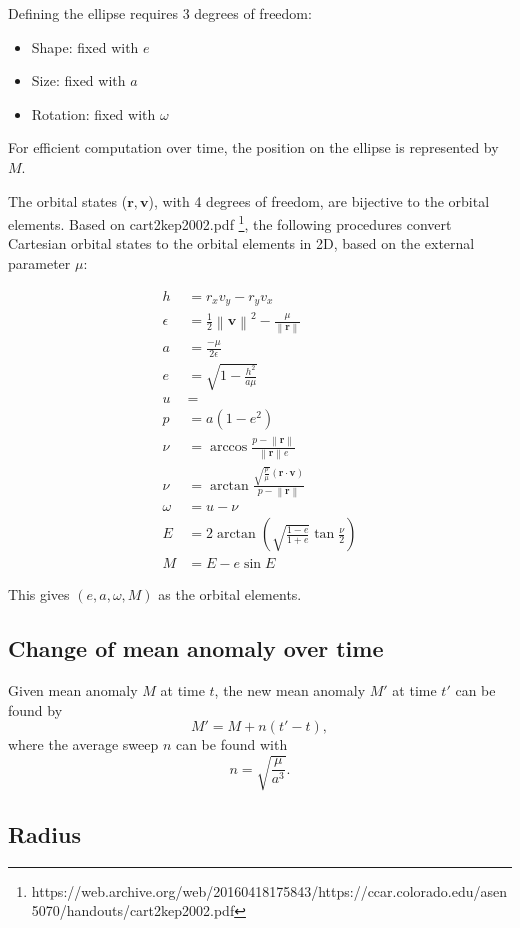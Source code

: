 \documentclass{article}
\def\p#1{ \left( #1 \right)}
\def\norm#1{ \left\lVert #1 \right\rVert}
\begin{document}
Defining the ellipse requires 3 degrees of freedom:

\begin{itemize}
	\item Shape: fixed with $e$
	\item Size: fixed with $a$
	\item Rotation: fixed with $\omega$
\end{itemize}

For efficient computation over time, the position on the ellipse is represented by $M$.

The orbital states ($\mathbf r, \mathbf v$), with 4 degrees of freedom,
are bijective to the orbital elements.
Based on cart2kep2002.pdf
\footnote{https://web.archive.org/web/20160418175843/https://ccar.colorado.edu/asen5070/handouts/cart2kep2002.pdf},
the following procedures convert Cartesian orbital states to the orbital elements in 2D,
based on the external parameter $\mu$:

\begin{align*}
	h &= r_x v_y - r_y v_x \\
	\epsilon &= \frac12 \norm{\mathbf v}^2 - \frac\mu{\norm{\mathbf r}} \\
	a &= \frac{-\mu}{2\epsilon} \\
	e &= \sqrt{1 - \frac{h^2}{a\mu}} \\
	u &= \\
	p &= a (1 - e^2) \\
	\nu &= \arccos \frac{p - \norm{\mathbf r}}{\norm{\mathbf r}e} \\
	\nu &= \arctan \frac{\sqrt{\frac p\mu} (\mathbf r \cdot \mathbf v)}{p - \norm{\mathbf r}} \\
	\omega &= u - \nu \\
	E &= 2 \arctan \p{\sqrt{\frac{1-e}{1+e}} \tan \frac\nu2} \\
	M &= E - e \sin E
\end{align*}

This gives $(e, a, \omega, M)$ as the orbital elements.

\subsection{Change of mean anomaly over time}
Given mean anomaly $M$ at time $t$,
the new mean anomaly $M'$ at time $t'$ can be found by
$$ M' = M + n (t' - t), $$
where the average sweep $n$ can be found with
$$ n = \sqrt{\frac\mu{a^3}}. $$

\subsection{Radius}
\end{document}
